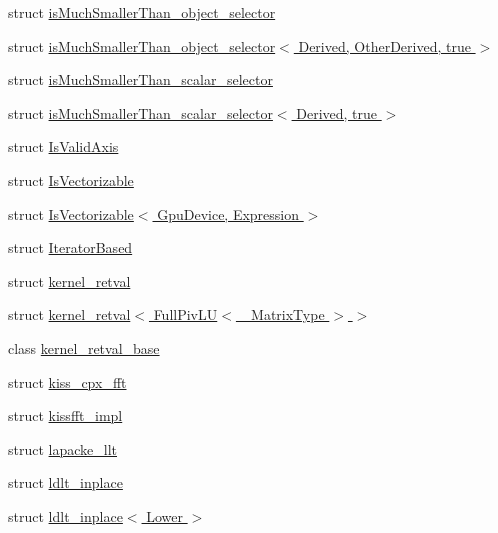 \begin{DoxyCompactItemize}
\item 
struct \hyperlink{struct_eigen_1_1internal_1_1is_much_smaller_than__object__selector}{is\+Much\+Smaller\+Than\+\_\+object\+\_\+selector}
\item 
struct \hyperlink{struct_eigen_1_1internal_1_1is_much_smaller_than__object__selector_3_01_derived_00_01_other_derived_00_01true_01_4}{is\+Much\+Smaller\+Than\+\_\+object\+\_\+selector$<$ Derived, Other\+Derived, true $>$}
\item 
struct \hyperlink{struct_eigen_1_1internal_1_1is_much_smaller_than__scalar__selector}{is\+Much\+Smaller\+Than\+\_\+scalar\+\_\+selector}
\item 
struct \hyperlink{struct_eigen_1_1internal_1_1is_much_smaller_than__scalar__selector_3_01_derived_00_01true_01_4}{is\+Much\+Smaller\+Than\+\_\+scalar\+\_\+selector$<$ Derived, true $>$}
\item 
struct \hyperlink{struct_eigen_1_1internal_1_1_is_valid_axis}{Is\+Valid\+Axis}
\item 
struct \hyperlink{struct_eigen_1_1internal_1_1_is_vectorizable}{Is\+Vectorizable}
\item 
struct \hyperlink{struct_eigen_1_1internal_1_1_is_vectorizable_3_01_gpu_device_00_01_expression_01_4}{Is\+Vectorizable$<$ Gpu\+Device, Expression $>$}
\item 
struct \hyperlink{struct_eigen_1_1internal_1_1_iterator_based}{Iterator\+Based}
\item 
struct \hyperlink{struct_eigen_1_1internal_1_1kernel__retval}{kernel\+\_\+retval}
\item 
struct \hyperlink{struct_eigen_1_1internal_1_1kernel__retval_3_01_full_piv_l_u_3_01___matrix_type_01_4_01_4}{kernel\+\_\+retval$<$ Full\+Piv\+L\+U$<$ \+\_\+\+Matrix\+Type $>$ $>$}
\item 
class \hyperlink{struct_eigen_1_1internal_1_1kernel__retval__base}{kernel\+\_\+retval\+\_\+base}
\item 
struct \hyperlink{struct_eigen_1_1internal_1_1kiss__cpx__fft}{kiss\+\_\+cpx\+\_\+fft}
\item 
struct \hyperlink{struct_eigen_1_1internal_1_1kissfft__impl}{kissfft\+\_\+impl}
\item 
struct \hyperlink{struct_eigen_1_1internal_1_1lapacke__llt}{lapacke\+\_\+llt}
\item 
struct \hyperlink{struct_eigen_1_1internal_1_1ldlt__inplace}{ldlt\+\_\+inplace}
\item 
struct \hyperlink{struct_eigen_1_1internal_1_1ldlt__inplace_3_01_lower_01_4}{ldlt\+\_\+inplace$<$ Lower $>$}

\end{DoxyCompactItemize}
